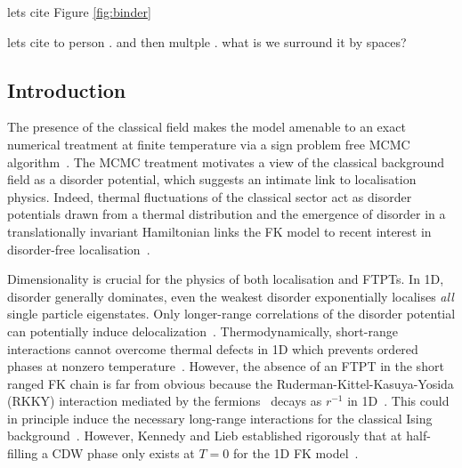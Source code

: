 lets cite Figure \ref{fig:binder}

lets cite to person \textcite{trebstKitaevMaterials2022}. and then multple \autocite{banerjeeProximateKitaevQuantum2016,trebstKitaevMaterials2022}. what is we surround it by spaces? \textcite{trebstKitaevMaterials2022}

\hypertarget{introduction}{%
\subsection{Introduction}\label{introduction}}

The presence of the classical field makes the model amenable to an exact numerical treatment at finite temperature via a sign problem free MCMC algorithm~\autocite{devriesGapsDensitiesStates1993,devriesSimplifiedHubbardModel1993,antipovInteractionTunedAndersonMott2016,debskiPossibilityDetectionFinite2016,herrmannSpreadingCorrelationsFalicovKimball2018,maskaThermodynamicsTwodimensionalFalicovKimball2006}. The MCMC treatment motivates a view of the classical background field as a disorder potential, which suggests an intimate link to localisation physics. Indeed, thermal fluctuations of the classical sector act as disorder potentials drawn from a thermal distribution and the emergence of disorder in a translationally invariant Hamiltonian links the FK model to recent interest in disorder-free localisation~\autocite{smithDisorderFreeLocalization2017,smithDynamicalLocalizationMathbbZ2018,brenesManyBodyLocalizationDynamics2018}.

Dimensionality is crucial for the physics of both localisation and FTPTs. In 1D, disorder generally dominates, even the weakest disorder exponentially localises \emph{all} single particle eigenstates. Only longer-range correlations of the disorder potential can potentially induce delocalization~\autocite{aubryAnalyticityBreakingAnderson1980,dassarmaLocalizationMobilityEdges1990,dunlapAbsenceLocalizationRandomdimer1990}. Thermodynamically, short-range interactions cannot overcome thermal defects in 1D which prevents ordered phases at nonzero temperature~\autocite{andersonAbsenceDiffusionCertain1958,goldshteinPurePointSpectrum1977,abrahamsScalingTheoryLocalization1979,kramerLocalizationTheoryExperiment1993}. However, the absence of an FTPT in the short ranged FK chain is far from obvious because the Ruderman-Kittel-Kasuya-Yosida (RKKY) interaction mediated by the fermions~\autocite{kasuyaTheoryMetallicFerro1956,rudermanIndirectExchangeCoupling1954,vanvleckNoteInteractionsSpins1962,yosidaMagneticPropertiesCuMn1957} decays as \(r^{-1}\) in 1D~\autocite{rusinCalculationRKKYRange2017a}. This could in principle induce the necessary long-range interactions for the classical Ising background~\autocite{thoulessLongRangeOrderOneDimensional1969,peierlsIsingModelFerromagnetism1936}. However, Kennedy and Lieb established rigorously that at half-filling a CDW phase only exists at \(T = 0\) for the 1D FK model~\autocite{kennedyItinerantElectronModel1986}.


